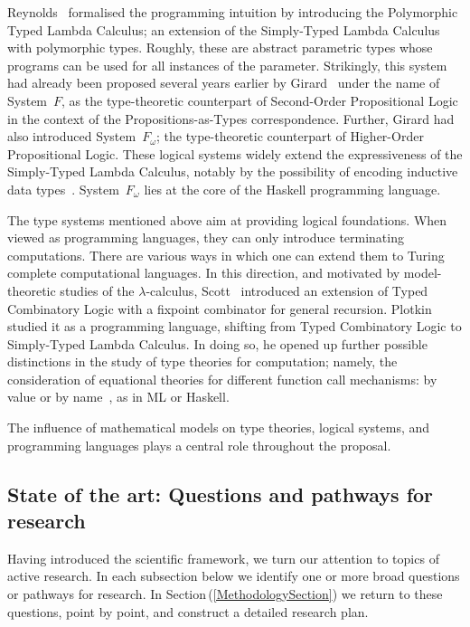 \documentclass[11pt,twocolumn]{article}
\newcommand{\pref}[1]{\,(\ref{#1})}
\newcommand{\lcalculus}{\mbox{$\lambda$-calculus}}
\newcommand{\SystemF}{\mbox{System~$F$}}
\newcommand{\SystemFomega}{\mbox{System~$F_\omega$}}
\begin{document}
Reynolds~\cite{Reynolds} formalised the programming intuition by introducing
the Polymorphic Typed Lambda Calculus; an extension of the Simply-Typed Lambda
Calculus with polymorphic types.  Roughly, these are abstract parametric types
whose programs can be used for all instances of the parameter.  Strikingly,
this system had already been proposed several years earlier by
Girard~\cite{GirardSystemF} under the name of {\SystemF}, as the
type-theoretic counterpart of Second-Order Propositional Logic in the
context of the Propositions-as-Types correspondence.  Further, Girard had
also introduced {\SystemFomega}; the type-theoretic counterpart of
Higher-Order Propositional Logic.  These logical systems widely extend the
expressiveness of the Simply-Typed Lambda Calculus, notably by the
possibility of encoding inductive data types~\cite{BoehmBerarducci}.
{\SystemFomega} lies at the core of the Haskell programming
language. %

The type systems mentioned above aim at providing logical foundations. 
When viewed as programming languages, they can only introduce terminating
computations.  There are various ways in which one can extend them to Turing
complete computational languages.  In this direction, and motivated by
model-theoretic studies of the \lcalculus, Scott~\cite{ScottTCS}
introduced an extension of Typed Combinatory Logic with a fixpoint
combinator for general recursion.  Plotkin~\cite{PlotkinLCF} studied it as a
programming language, shifting from Typed Combinatory Logic to Simply-Typed
Lambda Calculus.  In doing so, he opened up further possible distinctions in
the study of type theories for computation; namely, the consideration of
equational theories for different function call mechanisms: by value or by
name~\cite{PlotkinCBVCBN}, as in ML or Haskell.  

The influence of mathematical models on type theories, logical systems, and
programming languages %
plays a central role throughout the proposal.

\subsection{State of the art: Questions and pathways for research}
\label{StateOfTheArtSubsection}

Having introduced the scientific framework, we turn our attention to topics of
active research.  In each subsection below we identify one or more
broad questions or pathways for research.
In Section\pref{MethodologySection} we return to these questions, point by point,
and construct a detailed research plan.
\end{document}
